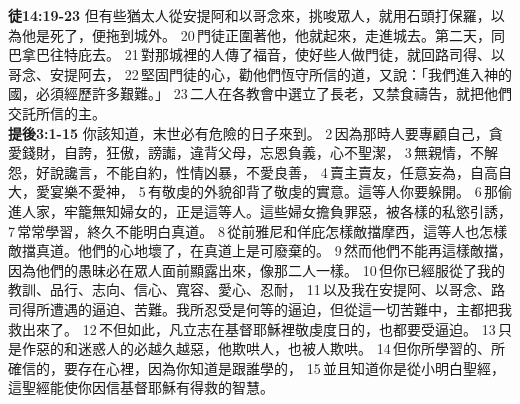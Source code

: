 \textbf{徒14:19-23} 但有些猶太人從安提阿和以哥念來，挑唆眾人，就用石頭打保羅，以為他是死了，便拖到城外。 20 門徒正圍著他，他就起來，走進城去。第二天，同巴拿巴往特庇去。 21 對那城裡的人傳了福音，使好些人做門徒，就回路司得、以哥念、安提阿去， 22 堅固門徒的心，勸他們恆守所信的道，又說：「我們進入神的國，必須經歷許多艱難。」 23 二人在各教會中選立了長老，又禁食禱告，就把他們交託所信的主。\\

\textbf{提後3:1-15} 你該知道，末世必有危險的日子來到。 2 因為那時人要專顧自己，貪愛錢財，自誇，狂傲，謗讟，違背父母，忘恩負義，心不聖潔， 3 無親情，不解怨，好說讒言，不能自約，性情凶暴，不愛良善， 4 賣主賣友，任意妄為，自高自大，愛宴樂不愛神， 5 有敬虔的外貌卻背了敬虔的實意。這等人你要躲開。 6 那偷進人家，牢籠無知婦女的，正是這等人。這些婦女擔負罪惡，被各樣的私慾引誘， 7 常常學習，終久不能明白真道。 8 從前雅尼和佯庇怎樣敵擋摩西，這等人也怎樣敵擋真道。他們的心地壞了，在真道上是可廢棄的。 9 然而他們不能再這樣敵擋，因為他們的愚昧必在眾人面前顯露出來，像那二人一樣。 10 但你已經服從了我的教訓、品行、志向、信心、寬容、愛心、忍耐， 11 以及我在安提阿、以哥念、路司得所遭遇的逼迫、苦難。我所忍受是何等的逼迫，但從這一切苦難中，主都把我救出來了。 12 不但如此，凡立志在基督耶穌裡敬虔度日的，也都要受逼迫。 13 只是作惡的和迷惑人的必越久越惡，他欺哄人，也被人欺哄。 14 但你所學習的、所確信的，要存在心裡，因為你知道是跟誰學的， 15 並且知道你是從小明白聖經，這聖經能使你因信基督耶穌有得救的智慧。

